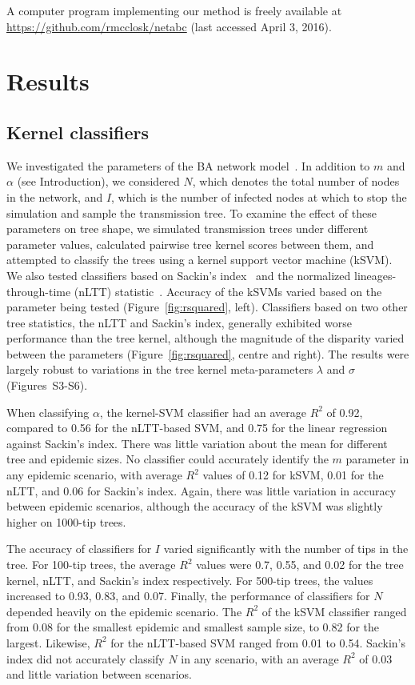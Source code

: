 \documentclass[nogrid]{MBE}
\begin{document}
A computer program implementing our method is freely available at
\url{https://github.com/rmcclosk/netabc} (last accessed April 3, 2016).

\section{Results}

\subsection{Kernel classifiers}



We investigated the parameters of the BA network
model~\citep{barabasi1999emergence}. In addition to $m$ and $\alpha$ (see
Introduction), we considered $N$, which denotes the total number of nodes in
the network, and $I$, which is the number of infected nodes at which to stop
the simulation and sample the transmission tree. To examine the effect of these
parameters on tree shape, we simulated transmission trees under different
parameter values, calculated pairwise tree kernel scores between them, and
attempted to classify the trees using a kernel support vector machine (kSVM).
We also tested classifiers based on Sackin's index~\citep{shao1990tree} and the
normalized lineages-through-time (nLTT)
statistic~\citep{janzen2015approximate}. Accuracy of the kSVMs varied based on
the parameter being tested (Figure~\ref{fig:rsquared}, left). Classifiers based
on two other tree statistics, the nLTT and Sackin's index, generally exhibited
worse performance than the tree kernel, although the magnitude of the disparity
varied between the parameters (Figure~\ref{fig:rsquared}, centre and right).
The results were largely robust to variations in the tree kernel
meta-parameters $\lambda$ and $\sigma$ (Figures~S3-S6).

When classifying $\alpha$, the kernel-SVM classifier had an average $R^2$ of 
    0.92,
compared to 
    0.56
for the nLTT-based SVM, and
    0.75
for the linear regression against Sackin's index. There was little variation
about the mean for different tree and epidemic sizes. No classifier could
accurately identify the $m$ parameter in any epidemic scenario, with average
$R^2$ values of 
  0.12 for kSVM,
  0.01 for the nLTT, and
  0.06
for Sackin's index. Again, there was little variation in accuracy between
epidemic scenarios, although the accuracy of the kSVM was slightly higher
on 1000-tip trees.

The accuracy of classifiers for $I$ varied significantly with the number of
tips in the tree. For 100-tip trees, the average $R^2$ values were
  0.7,
  0.55, and
  0.02
for the tree kernel, nLTT, and Sackin's index respectively. For 500-tip
trees, the values increased to
  0.93,
  0.83, and
  0.07.
Finally, the performance of classifiers for $N$ depended heavily on the
epidemic scenario. The $R^2$ of the kSVM classifier ranged from
  0.08
for the smallest epidemic and smallest sample size, to
  0.82
for the largest. Likewise, $R^2$ for the nLTT-based SVM ranged from 
  0.01
to
  0.54.
Sackin's index did not accurately classify $N$ in any scenario, with an average
$R^2$ of
  0.03
and little variation between scenarios.
\end{document}
